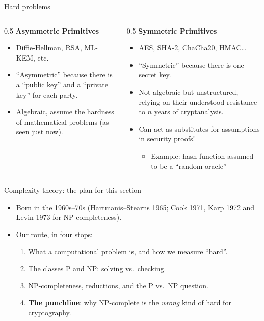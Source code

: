 \ifdefined\PRESENTATION\else\PassOptionsToClass{handout}{beamer}\fi\documentclass[aspectratio=169, lualatex]{beamer}
\begin{document}
\begin{frame}{Hard problems}
	\begin{columns}[c]
		\begin{column}{0.5\textwidth}
			\textbf{Asymmetric Primitives}
			\begin{itemize}[<+->]
				\item Diffie-Hellman, RSA, ML-KEM, etc.
				\item ``Asymmetric'' because there is a ``public key'' and a ``private
				      key'' for each party.
				\item Algebraic, assume the hardness of mathematical problems (as seen
				      just now).
			\end{itemize}
		\end{column}

		\begin{column}{0.5\textwidth}
			\textbf{Symmetric Primitives}
			\begin{itemize}[<+->]
				\item AES, SHA-2, ChaCha20, HMAC\ldots
				\item ``Symmetric'' because there is one secret key.
				\item Not algebraic but unstructured, relying on their understood
				      resistance to $n$ years of cryptanalysis.
				\item Can act as substitutes for assumptions in security proofs!
				      \begin{itemize}
					      \item Example: hash function assumed to be a ``random oracle''
				      \end{itemize}
			\end{itemize}
		\end{column}
	\end{columns}
\end{frame}

\begin{frame}{Complexity theory: the plan for this section}
	\begin{itemize}[<+->]
		\item Born in the 1960s--70s (Hartmanis--Stearns 1965; Cook 1971, Karp 1972 and Levin 1973 for NP-completeness).
		\item Our route, in four stops:
		      \begin{enumerate}
			      \item What a computational problem is, and how we measure ``hard''.
			      \item The classes P and NP: solving vs.\ checking.
			      \item NP-completeness, reductions, and the P vs.\ NP question.
			      \item \textbf{The punchline}: why NP-complete is the \emph{wrong} kind of hard for cryptography.
		      \end{enumerate}
	\end{itemize}
\end{frame}
\end{document}
